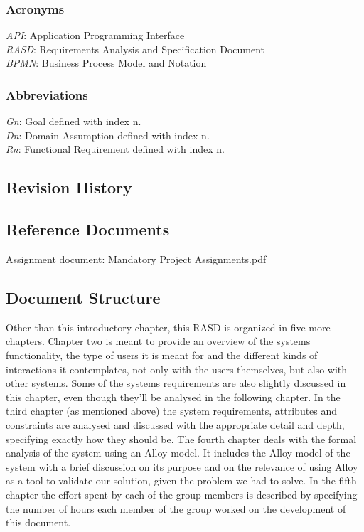 \documentclass[12pt]{article}
\begin{document}
\subsubsection{Acronyms}
\textit{API}: Application Programming Interface\\
\textit{RASD}: Requirements Analysis and Specification Document\\
\textit{BPMN}: Business Process Model and Notation
\subsubsection{Abbreviations}
\textit{Gn}: Goal defined with index n.\\
\textit{Dn}: Domain Assumption defined with index n.\\
\textit{Rn}: Functional Requirement defined with index n.


\subsection{Revision History}

\subsection{Reference Documents}
Assignment document: Mandatory Project Assignments.pdf

\subsection{Document Structure}
Other than this introductory chapter, this RASD is organized in five more chapters. Chapter two is meant to provide an overview of the systems functionality, the type of users it is meant for and the different kinds of interactions it contemplates, not only with the users themselves, but also with other systems. Some of the systems requirements are also slightly discussed in this chapter, even though they’ll be analysed in the following chapter. In the third chapter (as mentioned above) the system requirements, attributes and constraints are analysed and discussed with the appropriate detail and depth, specifying exactly how they should be.
The fourth chapter deals with the formal analysis of the system using an Alloy model. It includes the Alloy model of the system with a brief discussion on its purpose and on the relevance of using Alloy as a tool to validate our solution, given the problem we had to solve.
In the fifth chapter the effort spent by each of the group members is described by specifying the number of hours each member of the group worked on the development of this document.
\end{document}

